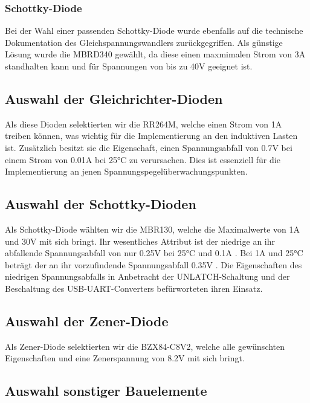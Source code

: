 \subsubsection{Schottky-Diode}
Bei der Wahl einer passenden Schottky-Diode wurde ebenfalls auf die technische Dokumentation des Gleichspannungswandlers zurückgegriffen.
Als günstige Lösung wurde die MBRD340 gewählt, da diese einen maxmimalen Strom von 3A standhalten kann und für Spannungen von bis zu 40V geeignet ist.

\subsection{Auswahl der Gleichrichter-Dioden}

Als diese Dioden selektierten wir die RR264M, welche einen Strom von 1A treiben können, was wichtig für die Implementierung an den induktiven Lasten ist.
Zusätzlich besitzt sie die Eigenschaft, einen Spannungsabfall von 0.7V bei einem Strom von 0.01A bei 25°C zu verursachen.
Dies ist essenziell für die Implementierung an jenen Spannungspegelüberwachungspunkten.

\subsection{Auswahl der Schottky-Dioden}

Als Schottky-Diode wählten wir die MBR130, welche die Maximalwerte von 1A und 30V mit sich bringt.
Ihr wesentliches Attribut ist der niedrige an ihr abfallende Spannungsabfall von nur 0.25V bei 25°C und 0.1A .
Bei 1A und 25°C beträgt der an ihr vorzufindende Spannungsabfall 0.35V .
Die Eigenschaften des niedrigen Spannungsabfalls in Anbetracht der UNLATCH-Schaltung und der Beschaltung des USB-UART-Converters befürworteten ihren Einsatz.

\subsection{Auswahl der Zener-Diode}

Als Zener-Diode selektierten wir die BZX84-C8V2, welche alle gewünschten Eigenschaften und eine Zenerspannung von 8.2V mit sich bringt.

\subsection{Auswahl sonstiger Bauelemente}

